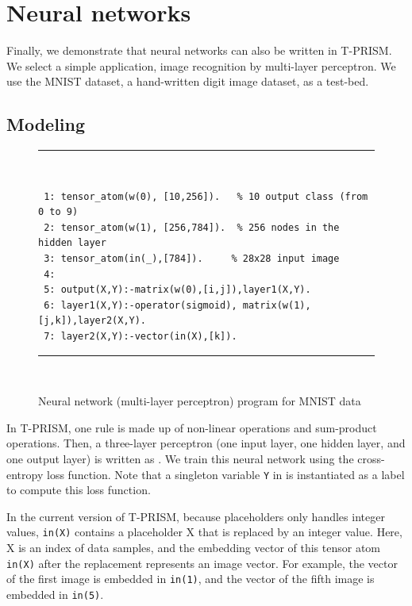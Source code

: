 \documentclass[a4paper]{report}
\begin{document}
\section{Neural networks}
\label{sec:nn}

Finally, we demonstrate that neural networks can also be written in T-PRISM.
We select a simple application, image recognition by multi-layer perceptron.
We use the MNIST dataset, a hand-written digit image dataset, as a test-bed.

\subsection*{Modeling}

\begin{figure}[tb]
	\rule{0.85\textwidth}{0.10mm}\\ [-1em]
	\begin{verbatim}
 1: tensor_atom(w(0), [10,256]).   % 10 output class (from 0 to 9)
 2: tensor_atom(w(1), [256,784]).  % 256 nodes in the hidden layer
 3: tensor_atom(in(_),[784]).     % 28x28 input image
 4: 
 5: output(X,Y):-matrix(w(0),[i,j]),layer1(X,Y).
 6: layer1(X,Y):-operator(sigmoid), matrix(w(1),[j,k]),layer2(X,Y).
 7: layer2(X,Y):-vector(in(X),[k]).
	\end{verbatim}
	\rule{0.85\textwidth}{0.10mm}\\ [-1em]
	\caption{Neural network (multi-layer perceptron) program for MNIST data}
	\label{fig:nn}
\end{figure}

In  T-PRISM,  one  rule  is  made  up  of  non-linear  operations  and
sum-product  operations.  Then,  a  three-layer perceptron
(one input layer,  one hidden layer, and one output  layer) is written
as .   We train this  neural network using  the cross-entropy loss
function.
Note  that  a singleton  variable  {\tt  Y} in    is
instantiated as a label to compute this loss function.  


In the current version of T-PRISM, because placeholders only handles integer values, {\tt in(X)} contains a placeholder X that is replaced by an integer value.
Here, X is an index of data samples, and the embedding vector of this tensor atom {\tt in(X)} after the replacement represents an image vector.
For example, the vector of the first image is embedded in {\tt in(1)}, and the vector of the fifth image is embedded in {\tt in(5)}.
\end{document}
